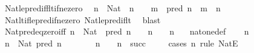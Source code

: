 \begin{isabellebody}
\endisatagproof
{\isafoldproof}%
%
\isadelimproof
\isanewline
%
\endisadelimproof
\isanewline
{}\isamarkupfalse%
\ Nat{\isacharunderscore}{\kern0pt}le{\isacharunderscore}{\kern0pt}pred{\isacharunderscore}{\kern0pt}iff{\isacharunderscore}{\kern0pt}lt{\isacharunderscore}{\kern0pt}if{\isacharunderscore}{\kern0pt}ne{\isacharunderscore}{\kern0pt}zero{\isacharcolon}{\kern0pt}\isanewline
\ \ {\isachardoublequoteopen}n\ {\isacharcolon}{\kern0pt}\ Nat\ {\isasymLongrightarrow}\ n\ {\isasymnoteq}\ {}\ {\isasymLongrightarrow}\ m\ {\isasymle}\ pred\ n\ {\isasymlongleftrightarrow}\ m\ {\isacharless}{\kern0pt}\ n{\isachardoublequoteclose}\isanewline
%
\isadelimproof
\ \ %
\endisadelimproof
%
\isatagproof
{}\isamarkupfalse%
\ Nat{\isacharunderscore}{\kern0pt}lt{\isacharunderscore}{\kern0pt}if{\isacharunderscore}{\kern0pt}le{\isacharunderscore}{\kern0pt}pred{\isacharunderscore}{\kern0pt}if{\isacharunderscore}{\kern0pt}ne{\isacharunderscore}{\kern0pt}zero\ Nat{\isacharunderscore}{\kern0pt}le{\isacharunderscore}{\kern0pt}pred{\isacharunderscore}{\kern0pt}if{\isacharunderscore}{\kern0pt}lt\ \isamarkupfalse%
\ blast%
\endisatagproof
{\isafoldproof}%
%
\isadelimproof
\isanewline
%
\endisadelimproof
\isanewline
{}\isamarkupfalse%
\ Nat{\isacharunderscore}{\kern0pt}pred{\isacharunderscore}{\kern0pt}eq{\isacharunderscore}{\kern0pt}zero{\isacharunderscore}{\kern0pt}iff{\isacharcolon}{\kern0pt}\ {\isachardoublequoteopen}n\ {\isacharcolon}{\kern0pt}\ Nat\ {\isasymLongrightarrow}\ pred\ n\ {\isacharequal}{\kern0pt}\ {}\ {\isasymlongleftrightarrow}\ n\ {\isacharequal}{\kern0pt}\ {}\ {\isasymor}\ n\ {\isacharequal}{\kern0pt}\ {}{\isachardoublequoteclose}\isanewline
%
\isadelimproof
%
\endisadelimproof
%
\isatagproof
{}\isamarkupfalse%
\ nat{\isacharunderscore}{\kern0pt}one{\isacharunderscore}{\kern0pt}def\isanewline
{}\isamarkupfalse%
\isanewline
\ \ \isamarkupfalse%
\ n\ \isamarkupfalse%
\ {\isachardoublequoteopen}n\ {\isacharcolon}{\kern0pt}\ Nat{\isachardoublequoteclose}\ {\isachardoublequoteopen}pred\ n\ {\isacharequal}{\kern0pt}\ {}{\isachardoublequoteclose}\isanewline
\ \ \isamarkupfalse%
\ \isamarkupfalse%
\ {\isachardoublequoteopen}n\ {\isacharequal}{\kern0pt}\ {}\ {\isasymor}\ n\ {\isacharequal}{\kern0pt}\ succ\ {}{\isachardoublequoteclose}\isanewline
\ \ \isamarkupfalse%
\ {\isacharparenleft}{\kern0pt}cases\ n\ rule{\isacharcolon}{\kern0pt}\ NatE{\isacharparenright}{\kern0pt}\isanewline

\end{isabellebody}
